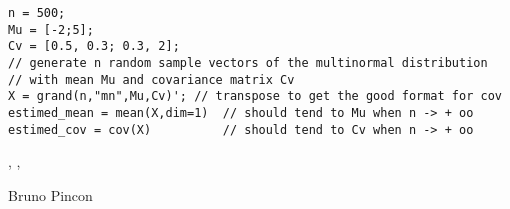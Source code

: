\begin{examples}
\begin{Verbatim}
n = 500;
Mu = [-2;5];
Cv = [0.5, 0.3; 0.3, 2];
// generate n random sample vectors of the multinormal distribution
// with mean Mu and covariance matrix Cv 
X = grand(n,"mn",Mu,Cv)'; // transpose to get the good format for cov
estimed_mean = mean(X,dim=1)  // should tend to Mu when n -> + oo
estimed_cov = cov(X)          // should tend to Cv when n -> + oo
\end{Verbatim}
\end{examples}

\begin{manseealso}
  , , 
\end{manseealso}

\begin{authors}
  Bruno Pincon
\end{authors}

